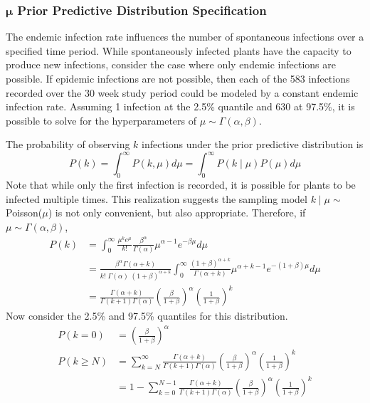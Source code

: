 \documentclass{uwstat572}
\begin{document}
\subsubsection{$\boldsymbol{\mu}$ Prior Predictive Distribution Specification}
The endemic infection rate influences the number of spontaneous infections over a specified time period. 
While spontaneously infected plants have the capacity to produce new infections, consider the case where only endemic infections are possible.
If epidemic infections are not possible, then each of the 583 infections recorded over the 30 week study period could be modeled by a constant endemic infection rate. 
Assuming 1 infection at the 2.5\% quantile and 630 at 97.5\%, it is possible to solve for the hyperparameters of $\mu \sim \Gamma(\alpha, \beta)$. 

The probability of observing $k$ infections under the prior predictive distribution is
\begin{equation}
P(k) = \int_0^{\infty} P(k, \mu) d\mu = \int_0^{\infty} P(k \mid \mu)  P(\mu) d\mu
\label{eq:prior_predictive}
\end{equation}
Note that while only the first infection is recorded, it is possible for plants to be infected multiple times. 
This realization suggests the sampling model $k \mid \mu \sim$ Poisson($\mu$) is not only convenient, but also appropriate. 
Therefore, if $\mu \sim \Gamma(\alpha, \beta)$,
\begin{align*}
P(k) &= \int_0^{\infty} \frac{\mu^k e^{\mu}}{k!}  \frac{\beta^{\alpha}}{\Gamma(\alpha)} \mu^{\alpha - 1} e^{-\beta \mu}d\mu \\
	&= \frac{\beta^{\alpha} \Gamma(\alpha+k)}{k! \; \Gamma(\alpha) \; (1+\beta)^{\alpha+k}}  \int_0^{\infty} \frac{(1+\beta)^{\alpha+k}}{\Gamma(\alpha+k)} \mu^{\alpha + k - 1} e^{-(1+\beta)\mu}d\mu \\
	&= \frac{\Gamma(\alpha+k)}{\Gamma(k+1) \Gamma(\alpha)} \left( \frac{\beta}{1+\beta} \right)^{\alpha} \left( \frac{1}{1+\beta} \right)^k
\end{align*}
Now consider the 2.5\% and 97.5\% quantiles for this distribution. 
\begin{align*}
P(k=0) &= \left( \frac{\beta}{1+\beta} \right)^{\alpha} \\
P(k \ge N) &= \sum_{k=N}^{\infty} \frac{\Gamma(\alpha+k)}{\Gamma(k+1) \Gamma(\alpha)} \left( \frac{\beta}{1+\beta} \right)^{\alpha} \left( \frac{1}{1+\beta} \right)^k \\
	&=1 - \sum_{k=0}^{N-1} \frac{\Gamma(\alpha+k)}{\Gamma(k+1) \Gamma(\alpha)} \left( \frac{\beta}{1+\beta} \right)^{\alpha} \left( \frac{1}{1+\beta} \right)^k 
\end{align*}
\end{document}
